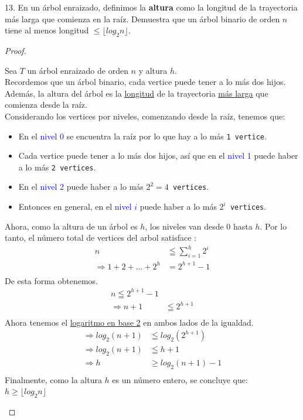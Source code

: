 \documentclass{article}
\begin{document}
\begin{justify}
  13. En un árbol enraizado, definimos la \textbf{altura} como la longitud de la trayectoria más larga que comienza en la raíz. Demuestra que
  un árbol binario de orden $n$ tiene al menos longitud $\leq \lfloor log_2n \rfloor$.
  \begin{proof}
    \begin{justify}
      Sea $T$ un árbol enraizado de orden $n$ y altura $h$. \\
      Recordemos que un árbol binario, cada vertice puede tener a lo más dos hijos. Además, la altura del árbol es la \underline{longitud}
      de la trayectoria \underline{más larga} que comienza desde la raíz. \\
      Considerando los vertices por niveles, comenzando desde la raíz, tenemos que: \\
      \begin{itemize}
      \item En el \textcolor{blue}{nivel 0} se encuentra la raíz por lo que hay a lo más \texttt{1 vertice}.
      \item Cada vertice puede tener a lo más dos hijos, así que en el \textcolor{blue}{nivel 1} puede haber a lo más \texttt{2 vertices}.
      \item En el \textcolor{blue}{nivel 2} puede haber a lo más \texttt{$2^2 = 4$ vertices}.
      \item Entonces en general, en el \textcolor{blue}{nivel $i$} puede haber a lo más \texttt{$2^i$ vertices}.
      \end{itemize}
      Ahora, como la altura de un árbol es $h$, los niveles van desde $0$ hasta $h$. Por lo tanto, el número total de vertices
      del arbol satisface : \\
      \begin{align}
        n &\leqq \sum_{i=1}^{h} 2^i \\
        \Longrightarrow 1+2+...+2^h &= 2^{h+1}-1 \\
      \end{align}
      De esta forma obtenemos. \\
      \begin{align}
        n \leqq 2^{h+1} -1 \\
        \Longrightarrow n+1 &\leqq 2^{h+1} \\
      \end{align}
      Ahora tenemos el \underline{logaritmo en base 2} en ambos lados de la igualdad. \\
      \begin{align}
        \Longrightarrow log_2(n+1) &\leqq log_2(2^{h+1})\\
        \Longrightarrow log_2(n+1) &\leqq h+1\\
        \Longrightarrow h &\geq log_2(n+1)-1 \\           
      \end{align}
      Finalmente, como la altura $h$ es un número entero, se concluye que: \\
      $h \geq \lfloor log_2n \rfloor$
    \end{justify}
  \end{proof}
\end{justify}
\end{document}
